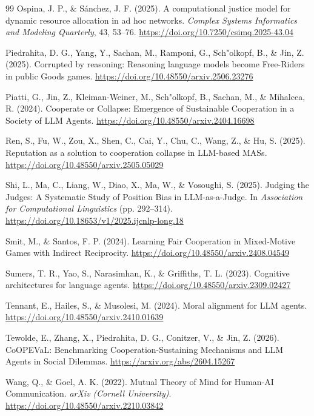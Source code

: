 \documentclass[12pt,letterpaper]{report}
\begin{document}
\begin{thebibliography}{99}
Ospina, J. P., \& S\'anchez, J. F. (2025). A computational justice model for dynamic resource allocation in ad hoc networks. \textit{Complex Systems Informatics and Modeling Quarterly}, 43, 53--76. \url{https://doi.org/10.7250/csimq.2025-43.04}

Piedrahita, D. G., Yang, Y., Sachan, M., Ramponi, G., Sch"olkopf, B., \& Jin, Z. (2025). Corrupted by reasoning: Reasoning language models become Free-Riders in public Goods games. \url{https://doi.org/10.48550/arxiv.2506.23276}

Piatti, G., Jin, Z., Kleiman-Weiner, M., Sch"olkopf, B., Sachan, M., \& Mihalcea, R. (2024). Cooperate or Collapse: Emergence of Sustainable Cooperation in a Society of LLM Agents. \url{https://doi.org/10.48550/arxiv.2404.16698}

Ren, S., Fu, W., Zou, X., Shen, C., Cai, Y., Chu, C., Wang, Z., \& Hu, S. (2025). Reputation as a solution to cooperation collapse in LLM-based MASs. \url{https://doi.org/10.48550/arxiv.2505.05029}

Shi, L., Ma, C., Liang, W., Diao, X., Ma, W., \& Vosoughi, S. (2025). Judging the Judges: A Systematic Study of Position Bias in LLM-as-a-Judge. In \textit{Association for Computational Linguistics} (pp. 292--314). \url{https://doi.org/10.18653/v1/2025.ijcnlp-long.18}

Smit, M., \& Santos, F. P. (2024). Learning Fair Cooperation in Mixed-Motive Games with Indirect Reciprocity. \url{https://doi.org/10.48550/arxiv.2408.04549}

Sumers, T. R., Yao, S., Narasimhan, K., \& Griffiths, T. L. (2023). Cognitive architectures for language agents. \url{https://doi.org/10.48550/arxiv.2309.02427}

Tennant, E., Hailes, S., \& Musolesi, M. (2024). Moral alignment for LLM agents. \url{https://doi.org/10.48550/arxiv.2410.01639}

Tewolde, E., Zhang, X., Piedrahita, D. G., Conitzer, V., \& Jin, Z. (2026). CoOPEVaL: Benchmarking Cooperation-Sustaining Mechanisms and LLM Agents in Social Dilemmas. \url{https://arxiv.org/abs/2604.15267}

Wang, Q., \& Goel, A. K. (2022). Mutual Theory of Mind for Human-AI Communication. \textit{arXiv (Cornell University)}. \url{https://doi.org/10.48550/arxiv.2210.03842}


\end{thebibliography}
\end{document}
